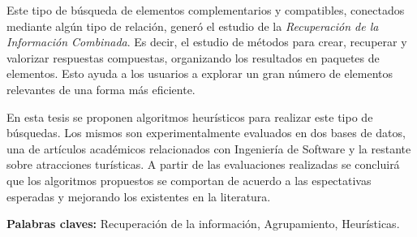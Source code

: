 Este tipo de búsqueda de elementos complementarios y compatibles, conectados mediante algún tipo de relación, generó el estudio de la {\em Recuperación de la Información Combinada}. Es decir, el estudio de métodos para crear, recuperar y valorizar respuestas compuestas, organizando los resultados en paquetes de elementos. Esto ayuda a los usuarios a explorar un gran número de elementos relevantes de una forma más eficiente.

En esta tesis se proponen algoritmos heurísticos para realizar este tipo de búsquedas. Los mismos son experimentalmente evaluados en dos bases de datos, una de artículos académicos relacionados con Ingeniería de Software y la restante sobre atracciones turísticas. A partir de las evaluaciones realizadas se concluirá que los algoritmos propuestos se comportan de acuerdo a las espectativas esperadas y mejorando los existentes en la literatura.
\bigskip

\noindent\textbf{Palabras claves:} Recuperación de la información, Agrupamiento, Heurísticas.